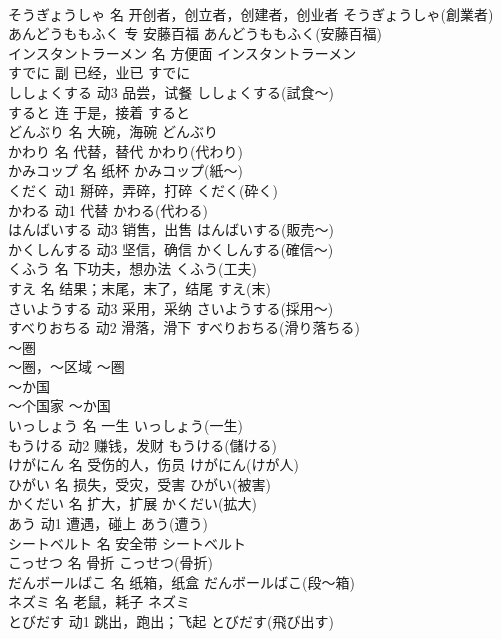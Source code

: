 \documentclass[8pt]{extreport}
\begin{document}
\begin{CJK}{UTF8}{min}
\\	そうぎょうしゃ	名	开创者，创立者，创建者，创业者	そうぎょうしゃ(創業者)	
\\	あんどうももふく	专	安藤百福	あんどうももふく(安藤百福)	
\\	インスタントラーメン	名	方便面	インスタントラーメン	
\\	すでに	副	已经，业已	すでに	
\\	ししょくする	动3	品尝，试餐	ししょくする(試食～)	
\\	すると	连	于是，接着	すると	
\\	どんぶり	名	大碗，海碗	どんぶり	
\\	かわり	名	代替，替代	かわり(代わり)	
\\	かみコップ	名	纸杯	かみコップ(紙～)	
\\	くだく	动1	掰碎，弄碎，打碎	くだく(砕く)	
\\	かわる	动1	代替	かわる(代わる)	
\\	はんばいする	动3	销售，出售	はんばいする(販売～)	
\\	かくしんする	动3	坚信，确信	かくしんする(確信～)	
\\	くふう	名	下功夫，想办法	くふう(工夫)	
\\	すえ	名	结果；末尾，末了，结尾	すえ(末)	
\\	さいようする	动3	采用，采纳	さいようする(採用～)	
\\	すべりおちる	动2	滑落，滑下	すべりおちる(滑り落ちる)	
\\	～圏	
\\	～圈，～区域	～圏	
\\	～か国	
\\	～个国家	～か国	
\\	いっしょう	名	一生	いっしょう(一生)	
\\	もうける	动2	赚钱，发财	もうける(儲ける)	
\\	けがにん	名	受伤的人，伤员	けがにん(けが人)	
\\	ひがい	名	损失，受灾，受害	ひがい(被害)	
\\	かくだい	名	扩大，扩展	かくだい(拡大)	
\\	あう	动1	遭遇，碰上	あう(遭う)	
\\	シートベルト	名	安全带	シートベルト	
\\	こっせつ	名	骨折	こっせつ(骨折)	
\\	だんボールばこ	名	纸箱，纸盒	だんボールばこ(段～箱)	
\\	ネズミ	名	老鼠，耗子	ネズミ	
\\	とびだす	动1	跳出，跑出；飞起	とびだす(飛び出す)	

\end{CJK}
\end{document}
